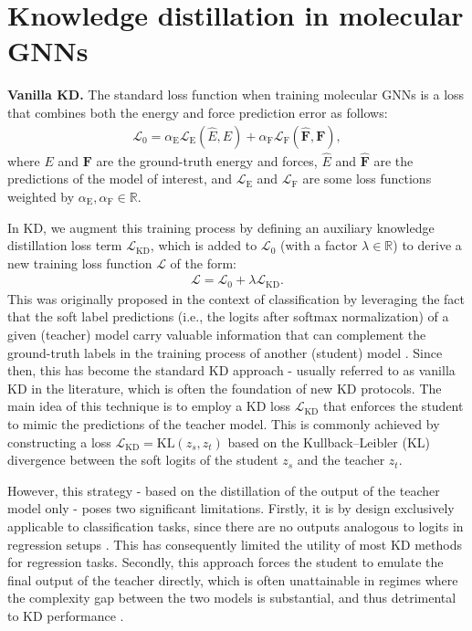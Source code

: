 \documentclass{article}
\newcommand{\loss}{\mathcal{L}}
\newcommand{\R}{\mathbb{R}} %
\begin{document}
\section{Knowledge distillation in molecular GNNs}
\textbf{Vanilla KD.}
The standard loss function when training molecular GNNs is a loss that combines both the energy and force prediction error as follows: 
\begin{align}
    \loss_0 = \alpha_\text{E} \loss_\text{E}(\hat{E}, E) + \alpha_\text{F} \loss_\text{F}(\hat{\boldsymbol{F}}, \boldsymbol{F}),
\end{align}
where $E$ and $\boldsymbol{F}$ are the ground-truth energy and forces, $\hat{E}$ and $\hat{\boldsymbol{F}}$ are the predictions of the model of interest, and $\loss_\text{E}$ and $\loss_\text{F}$ are some loss functions weighted by $\alpha_\text{E}, \alpha_\text{F}\in\R$. 

In KD, we augment this training process by defining an auxiliary knowledge distillation loss term $\loss_{\text{KD}}$, which is added to $\loss_0$ (with a factor $\lambda\in\R$) to derive a new training loss function $\loss$ of the form:
\begin{align}
    \loss = \loss_0 + \lambda \loss_{\text{KD}}.
\end{align}
This was originally proposed in the context of classification by leveraging the fact that the soft label predictions (i.e., the logits after softmax normalization) of a given (teacher) model carry valuable information that can complement the ground-truth labels in the training process of another (student) model \cite{hinton_distilling_2015}. Since then, this has become the standard KD approach - usually referred to as vanilla KD in the literature, which is often the foundation of new KD protocols. The main idea of this technique is to employ a KD loss $\loss_{\text{KD}}$ that enforces the student to mimic the predictions of the teacher model. This is commonly achieved by constructing a loss $\loss_{\text{KD}} = \text{KL}(z_s, z_t)$ based on the Kullback–Leibler (KL) divergence between the soft logits of the student $z_s$ and the teacher $z_t$.

However, this strategy - based on the distillation of the output of the teacher model only \cite{gou2021knowledge} - poses two significant limitations. Firstly, it is by design exclusively applicable to classification tasks, since there are no outputs analogous to logits in regression setups \cite{cheng2018model, saputra2019distilling}. This has consequently limited the utility of most KD methods for regression tasks. Secondly, this approach forces the student to emulate the final output of the teacher directly, which is often unattainable in regimes where the complexity gap between the two models is substantial, and thus detrimental to KD performance \cite{cho2019efficacy}. 
\end{document}
